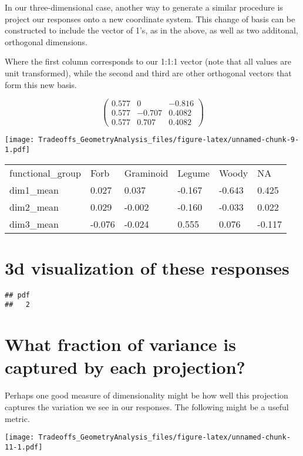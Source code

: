 \documentclass[]{article}
\begin{document}
In our three-dimensional case, another way to generate a similar
procedure is project our responses onto a new coordinate system. This
change of basis can be constructed to include the vector of 1's, as in
the above, as well as two additonal, orthogonal dimensions.

Where the first column corresponds to our 1:1:1 vector (note that all
values are unit transformed), while the second and third are other
orthogonal vectors that form this new basis.

\[
\left(\begin{array}{cc} 
0.577 & 0 & -0.816\\
0.577 & -0.707 & 0.4082\\
0.577 & 0.707 & 0.4082
\end{array}\right)
\]

\texttt{[image: Tradeoffs\_GeometryAnalysis\_files/figure-latex/unnamed-chunk-9-1.pdf]}

\begin{longtable}[]{@{}llllll@{}}
\toprule
\endhead
functional\_group & Forb & Graminoid & Legume & Woody &
NA\tabularnewline
dim1\_mean & 0.027 & 0.037 & -0.167 & -0.643 & 0.425\tabularnewline
dim2\_mean & 0.029 & -0.002 & -0.160 & -0.033 & 0.022\tabularnewline
dim3\_mean & -0.076 & -0.024 & 0.555 & 0.076 & -0.117\tabularnewline
\bottomrule
\end{longtable}

\hypertarget{d-visualization-of-these-responses}{%
\section{3d visualization of these
responses}\label{d-visualization-of-these-responses}}

\begin{verbatim}
## pdf 
##   2
\end{verbatim}

\hypertarget{what-fraction-of-variance-is-captured-by-each-projection}{%
\section{What fraction of variance is captured by each
projection?}\label{what-fraction-of-variance-is-captured-by-each-projection}}

Perhaps one good measure of dimensionality might be how well this
projection captures the variation we see in our responses. The following
might be a useful metric.

\texttt{[image: Tradeoffs\_GeometryAnalysis\_files/figure-latex/unnamed-chunk-11-1.pdf]}
\end{document}

